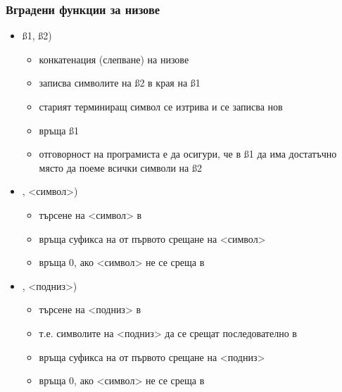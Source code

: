 \documentclass{beamer}
\begin{document}
\begin{frame}
  \frametitle{Вградени функции за низове}

  \begin{itemize}[<+->]
  \item {}\ss1, \ss2\tta)
    \begin{itemize}
    \item \alert{конкатенация} (слепване) на низове
    \item записва символите на \ss2 в края на \ss1
    \item старият терминиращ символ се изтрива и се записва нов
    \item връща \ss1
    \item \alert{отговорност на програмиста е да осигури, че в \ss1 да има достатъчно място да поеме всички символи на \ss2}
    \end{itemize}
  \item {}\s, <символ>\tta)
    \begin{itemize}
    \item търсене на <символ> в \s
    \item връща \alert{суфикса} на \s от първото срещане на <символ>
    \item връща 0, ако <символ> не се среща в \s
    \end{itemize}
  \item {}\s, <подниз>\tta)
    \begin{itemize}
    \item търсене на <подниз> в \s
    \item т.е. символите на <подниз> да се срещат последователно в \s
    \item връща \alert{суфикса} на \s от първото срещане на <подниз>
    \item връща 0, ако <символ> не се среща в \s
    \end{itemize}
  \end{itemize}
\end{frame}
\end{document}
